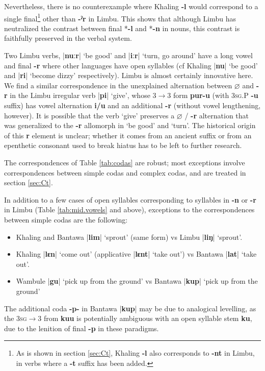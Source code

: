 \documentclass[oneside,a4paper,11pt]{article}
\newcommand{\ipa}[1]{\textbf{{\phon\mbox{#1}}}} %
\newcommand{\dhatu}[2]{|\ipa{#1}| `#2'}
\newcommand{\dhat}[1]{|\ipa{#1}|}
\begin{document}
Nevertheless, there is no counterexample where Khaling \ipa{-l} would correspond to a single final\footnote{As is shown in section \ref{sec:Ct}, Khaling \ipa{-l} also corresponds to \ipa{-nt} in Limbu, in verbs where a \ipa{-t} suffix has been added.} other than \ipa{-ˀr} in Limbu. This shows that although Limbu has neutralized the contrast between final *\ipa{-l} and  *\ipa{-n} in nouns, this contrast is faithfully preserved in the verbal system.


Two Limbu verbs, \dhatu{nuːr}{be good} and \dhatu{iːr}{turn, go around} have a long vowel and final \ipa{-r} where other languages have open syllables (cf Khaling \dhatu{nu}{be good} and \dhatu{ri}{become dizzy} respectively). Limbu is almost certainly innovative here. We find a similar correspondence in the unexplained alternation between $\varnothing$ and \ipa{-r} in the Limbu irregular verb \dhatu{pi}{give}, whose 3$\rightarrow$3 form \ipa{pur-u} (with \textsc{3sg.P} \ipa{-u} suffix) has vowel alternation \ipa{i/u} and an additional \ipa{-r} (without vowel lengthening, however). It is possible that the verb `give' preserves a $\varnothing$ / \ipa{-r} alternation that was generalized to the \ipa{-r} allomorph in `be good' and `turn'. The historical origin of this \ipa{r} element is unclear; whether it comes from an ancient suffix or from an epenthetic consonant used to break hiatus has to be left to further research.


The correspondences of Table \ref{tab:codas} are robust; most exceptions involve correspondences between simple codas and complex codas, and are treated in section \ref{sec:Ct}. 

In addition to a few cases of open syllables corresponding to syllables in \ipa{-n} or \ipa{-r} in Limbu (Table \ref{tab:mid.vowels} and above), exceptions to the correspondences between simple codas are the following:

\begin{itemize}
\item Khaling and Bantawa \dhatu{lim}{sprout}	 (same form) vs Limbu	\dhatu{liŋ}{sprout}.
\item Khaling \dhatu{lɛn}{come out} (applicative 	\dhatu{lɛnt}{take out}) vs Bantawa  \dhatu{lat}{take out}.
\item Wambule \dhatu{gu}{pick up from the ground} vs Bantawa \dhatu{kup}{pick up from the ground}
\end{itemize}

The additional coda \ipa{-p-} in Bantawa \dhat{kup} may be due to analogical levelling, as the \textsc{3sg}$\rightarrow$3 from \ipa{kuu} is potentially ambiguous with an open syllable stem \ipa{ku}, due to the lenition of final \ipa{-p} in these paradigms.
\end{document}
